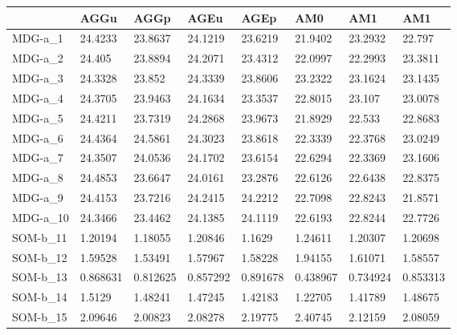 \documentclass[11pt,a4paper]{article}
\begin{document}
	\begin{table}[H]
		\begin{tabular}{l|l|l|l|l|l|l|l|}
			\cline{2-8}
			& AGGu     & AGGp     & AGEu     & AGEp     & AM0      & AM1      & AM1      \\ \hline
			\multicolumn{1}{|l|}{MDG-a\_1}  & 24.4233  & 23.8637  & 24.1219  & 23.6219  & 21.9402  & 23.2932  & 22.797   \\ \hline
			\multicolumn{1}{|l|}{MDG-a\_2}  & 24.405   & 23.8894  & 24.2071  & 23.4312  & 22.0997  & 22.2993  & 23.3811  \\ \hline
			\multicolumn{1}{|l|}{MDG-a\_3}  & 24.3328  & 23.852   & 24.3339  & 23.8606  & 23.2322  & 23.1624  & 23.1435  \\ \hline
			\multicolumn{1}{|l|}{MDG-a\_4}  & 24.3705  & 23.9463  & 24.1634  & 23.3537  & 22.8015  & 23.107   & 23.0078  \\ \hline
			\multicolumn{1}{|l|}{MDG-a\_5}  & 24.4211  & 23.7319  & 24.2868  & 23.9673  & 21.8929  & 22.533   & 22.8683  \\ \hline
			\multicolumn{1}{|l|}{MDG-a\_6}  & 24.4364  & 24.5861  & 24.3023  & 23.8618  & 22.3339  & 22.3768  & 23.0249  \\ \hline
			\multicolumn{1}{|l|}{MDG-a\_7}  & 24.3507  & 24.0536  & 24.1702  & 23.6154  & 22.6294  & 22.3369  & 23.1606  \\ \hline
			\multicolumn{1}{|l|}{MDG-a\_8}  & 24.4853  & 23.6647  & 24.0161  & 23.2876  & 22.6126  & 22.6438  & 22.8375  \\ \hline
			\multicolumn{1}{|l|}{MDG-a\_9}  & 24.4153  & 23.7216  & 24.2415  & 24.2212  & 22.7098  & 22.8243  & 21.8571  \\ \hline
			\multicolumn{1}{|l|}{MDG-a\_10} & 24.3466  & 23.4462  & 24.1385  & 24.1119  & 22.6193  & 22.8244  & 22.7726  \\ \hline
			\multicolumn{1}{|l|}{SOM-b\_11} & 1.20194  & 1.18055  & 1.20846  & 1.1629   & 1.24611  & 1.20307  & 1.20698  \\ \hline
			\multicolumn{1}{|l|}{SOM-b\_12} & 1.59528  & 1.53491  & 1.57967  & 1.58228  & 1.94155  & 1.61071  & 1.58557  \\ \hline
			\multicolumn{1}{|l|}{SOM-b\_13} & 0.868631 & 0.812625 & 0.857292 & 0.891678 & 0.438967 & 0.734924 & 0.853313 \\ \hline
			\multicolumn{1}{|l|}{SOM-b\_14} & 1.5129   & 1.48241  & 1.47245  & 1.42183  & 1.22705  & 1.41789  & 1.48675  \\ \hline
			\multicolumn{1}{|l|}{SOM-b\_15} & 2.09646  & 2.00823  & 2.08278  & 2.19775  & 2.40745  & 2.12159  & 2.08059  \\ \hline

\end{tabular}
\end{table}
\end{document}
